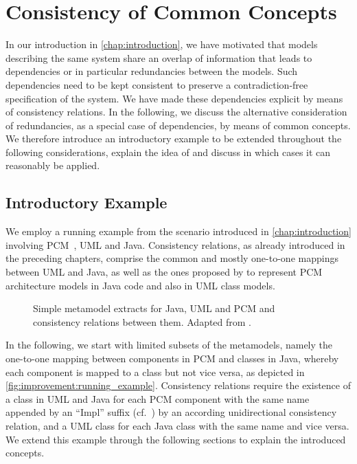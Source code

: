 \section{Consistency of Common Concepts}
\label{chap:improvement:concpets}

In our introduction in \autoref{chap:introduction}, we have motivated that models describing the same system share an overlap of information that leads to dependencies or in particular redundancies between the models.
Such dependencies need to be kept consistent to preserve a contradiction-free specification of the system.
We have made these dependencies explicit by means of consistency relations.
In the following, we discuss the alternative consideration of redundancies, as a special case of dependencies, by means of common concepts.
We therefore introduce an introductory example to be extended throughout the following considerations, explain the idea of \emph{\commonalities} and discuss in which cases it can reasonably be applied.


\subsection{Introductory Example}

We employ a running example from the scenario introduced in \autoref{chap:introduction} involving \gls{PCM}~\cite{reussner2016a}, \gls{UML} and Java.
Consistency relations, as already introduced in the preceding chapters, comprise the common and mostly one-to-one mappings between \gls{UML} and Java, as well as the ones proposed by \textcite{langhammer2015a} to represent \gls{PCM} architecture models in Java code and also in \gls{UML} class models.

\begin{figure}
	\centering
	
	\caption[Consistency relations for extracts of Java, \acrshort{UML} and \acrshort{PCM}]{Simple metamodel extracts for Java, UML and \gls{PCM} and consistency relations between them. Adapted from .}
	\label{fig:improvement:running_example}
\end{figure}

In the following, we start with limited subsets of the metamodels, namely the one-to-one mapping between components in \gls{PCM} and classes in Java, whereby each component is mapped to a class but not vice versa, as depicted in \autoref{fig:improvement:running_example}.
Consistency relations require the existence of a class in \gls{UML} and Java for each \gls{PCM} component with the same name appended by an \enquote{Impl} suffix (cf.~\cite{langhammer2015a}) by an according unidirectional consistency relation, and a \gls{UML} class for each Java class with the same name and vice versa.
We extend this example through the following sections to explain the introduced concepts.


